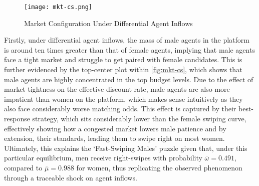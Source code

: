 \begin{figure}[ht]
    \centering
    \caption{Market Configuration Under Differential Agent Inflows}
    \texttt{[image: mkt-cs.png]}
    \label{fig:mkt-cs} 
\end{figure} 

Firstly, under differential agent inflows, the mass of male agents in the platform is around ten times greater than that of female agents, implying that male agents face a tight market and struggle to get paired with female candidates. This is further evidenced by the top-center plot within \autoref{fig:mkt-cs}, which shows that male agents are highly concentrated in the top budget levels. Due to the effect of market tightness on the effective discount rate, male agents are also more impatient than women on the platform, which makes sense intuitively as they also face considerably worse matching odds. This effect is captured by their best-response strategy, which sits considerably lower than the female swiping curve, effectively showing how a congested market lowers male patience and by extension, their standards, leading them to swipe right on most women. Ultimately, this explains the `Fast-Swiping Males' puzzle given that, under this particular equilibrium, men receive right-swipes with probability $\overline\omega=0.491$, compared to $\overline\mu=0.988$ for women, thus replicating the observed phenomenon through a traceable shock on agent inflows.